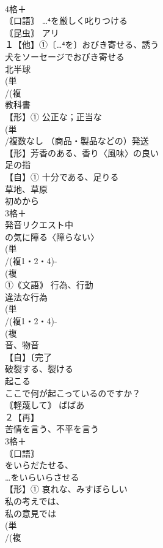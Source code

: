 \documentclass[8pt]{extreport}
\begin{document}
\begin{CJK}{UTF8}{min}
\\	4格＋
\\	｟口語｠ …⁴を厳しく叱りつける 
\\	｟昆虫｠ アリ 
\\	１【他】①〔…⁴を〕おびき寄せる、誘う 
\\	犬をソーセージでおびき寄せる
\\	北半球 
\\	(単
\\	/(複
\\	教科書 
\\	【形】① 公正な；正当な 
\\	(単
\\	/複数なし （商品・製品などの）発送 
\\	【形】芳香のある、香り〈風味〉の良い 
\\	足の指 
\\	【自】① 十分である、足りる 
\\	草地、草原 
\\	初めから
\\	3格＋
\\	発音リクエスト中	
\\	の気に障る〈障らない〉
\\	(単
\\	/(複1・2・4)-
\\	(複
\\	①｟文語｠ 行為、行動 
\\	違法な行為
\\	(単
\\	/(複1・2・4)-
\\	(複
\\	音、物音 
\\	【自】〔完了
\\	破裂する、裂ける 
\\	起こる 
\\	ここで何が起こっているのですか？
\\	｟軽蔑して｠ ばばあ
\\	２【再】
\\	苦情を言う、不平を言う 
\\	3格＋
\\	｟口語｠ 
\\	をいらだたせる、
\\	…をいらいらさせる
\\	【形】① 哀れな、みすぼらしい 
\\	私の考えでは、
\\	私の意見では
\\	(単
\\	/(複

\end{CJK}
\end{document}
